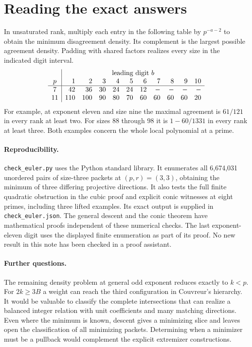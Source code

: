 \documentclass[11pt]{article}
\begin{document}
\section{Reading the exact answers}
In unsaturated rank, multiply each entry in the following table by $p^{-a-2}$ to obtain the minimum disagreement density. Its complement is the largest possible agreement density. Padding with shared factors realizes every size in the indicated digit interval.
\[
\begin{array}{c|rrrrrrrrrr}
 & \multicolumn{10}{c}{\text{leading digit }b}\\
 p &1&2&3&4&5&6&7&8&9&10\\\hline
 7&42&36&30&24&24&12&-&-&-&-\\
 11&110&100&90&80&70&60&60&60&60&20
\end{array}
\]
For example, at exponent eleven and size nine the maximal agreement is $61/121$ in every rank at least two. For sizes $88$ through $98$ it is $1-60/1331$ in every rank at least three. Both examples concern the whole local polynomial at a prime.

\paragraph{Reproducibility.}
\texttt{check\_euler.py} uses the Python standard library. It enumerates all 6,674,031 unordered pairs of size-three packets at $(p,r)=(3,3)$, obtaining the minimum of three differing projective directions. It also tests the full finite quadratic obstruction in the cubic proof and explicit conic witnesses at eight primes, including three lifted examples. Its exact output is supplied in \texttt{check\_euler.json}. The general descent and the conic theorem have mathematical proofs independent of these numerical checks. The last exponent-eleven digit uses the displayed finite enumeration as part of its proof. No new result in this note has been checked in a proof assistant.

\paragraph{Further questions.}
The remaining density problem at general odd exponent reduces exactly to $k<p$. For $2k\ge3B$ a weight can reach the third configuration in Couvreur's hierarchy. It would be valuable to classify the complete intersections that can realize a balanced integer relation with unit coefficients and many matching directions. Even where the minimum is known, descent gives a minimizing slice and leaves open the classification of all minimizing packets. Determining when a minimizer must be a pullback would complement the explicit extremizer constructions.
\end{document}
